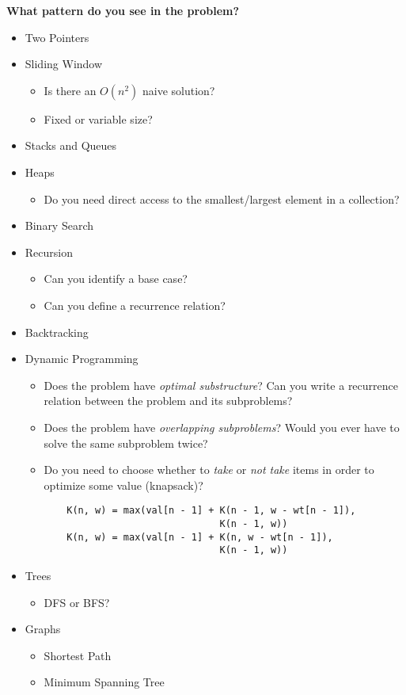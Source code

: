 \documentclass[12pt, titlepage]{article}
\begin{document}
\newpage
{}

\begin{center}
  \Large \textbf{What pattern do you see in the problem?}
\end{center} \medskip
\begin{itemize}
  \item Two Pointers
  \item Sliding Window
  \begin{itemize}
    \item Is there an $O(n^2)$ naive solution?
    \item Fixed or variable size?
  \end{itemize}
  \item Stacks and Queues
  \item Heaps
  \begin{itemize}
    \item Do you need direct access to the smallest/largest element in a collection?
  \end{itemize}
  \item Binary Search
  \item Recursion
  \begin{itemize}
    \item Can you identify a base case?
    \item Can you define a recurrence relation?
  \end{itemize}
  \item Backtracking
  \item Dynamic Programming
  \begin{itemize}
      \item Does the problem have \textit{optimal substructure}? Can you write a recurrence relation between the problem and its subproblems?
      \item Does the problem have \textit{overlapping subproblems}? Would you ever have to solve the same subproblem twice?
      \item Do you need to choose whether to \textit{take} or \textit{not take} items in order to optimize some value (knapsack)?
    \begin{verbatim}
    K(n, w) = max(val[n - 1] + K(n - 1, w - wt[n - 1]),
                               K(n - 1, w))
    K(n, w) = max(val[n - 1] + K(n, w - wt[n - 1]),
                               K(n - 1, w))\end{verbatim}
  \end{itemize}
  \item Trees
  \begin{itemize}
    \item DFS or BFS?
  \end{itemize}
  \item Graphs
  \begin{itemize}
    \item Shortest Path
    \item Minimum Spanning Tree
  \end{itemize}
\end{itemize}
\end{document}
